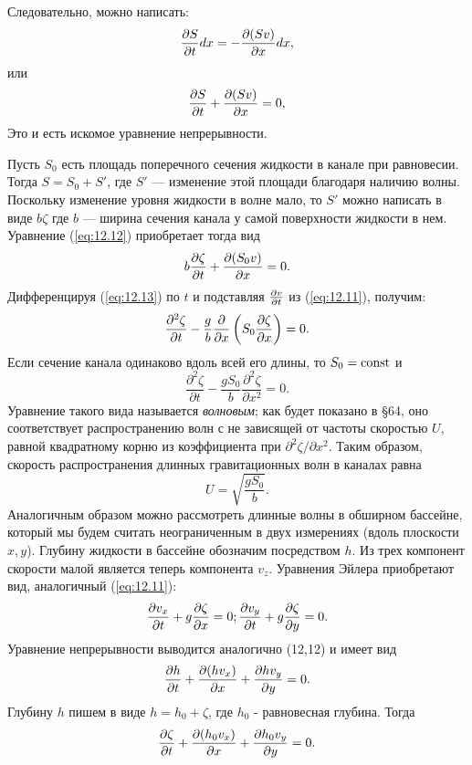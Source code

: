 Следовательно, можно написать:
\[
   \frac{\partial{S}}{\partial{t}}dx = - \frac{\partial{(Sv)}}{\partial{x}}dx,
\]
или
\begin{equation}
\label{eq:12.12}
       \frac{\partial{S}}{\partial{t}}+ \frac{\partial{(Sv)}}{\partial{x}} = 0,
\end{equation}
Это и есть искомое уравнение непрерывности.

Пусть $S_0$ есть площадь поперечного сечения жидкости в канале при равновесии.
Тогда $S = S_0 + S'$, где $S'$ — изменение этой площади благодаря наличию волны.
Поскольку изменение уровня жидкости в волне мало, то $S'$ можно написать в виде
$b\zeta$ где $b$ — ширина сечения канала у самой поверхности жидкости в нем.
Уравнение (\ref{eq:12.12}) приобретает тогда вид
\begin{equation}
    \label{eq:12.13}
    b \frac{\partial{\zeta}}{\partial{t}} + \frac{\partial{(S_0v)}}{\partial{x}} = 0.
\end{equation}
Дифференцируя (\ref{eq:12.13}) по $t$ и подставляя $\frac{\partial{v}}{\partial{t}}$ из (\ref{eq:12.11}), получим:
\begin{equation}
\label{eq:12.14}
   \frac{\partial^2\zeta}{\partial t} - \frac{g}{b} \frac{\partial}{\partial x}
   \left( S_0 \frac{\partial{\zeta}}{\partial{x}} \right) = 0.
\end{equation}
Если сечение канала одинаково вдоль всей его длины, то $S_0 = \mathop{\mathrm{const}}\nolimits$ и
\begin{equation}
\label{eq:12.15}
 \frac{\partial^2\zeta}{\partial t} - \frac{gS_0}{b} \frac{\partial^2\zeta}{\partial x^2} = 0.
\end{equation}
Уравнение такого вида называется \textit{волновым}; как будет показано в \S64,
оно соответствует распространению волн с не зависящей от частоты скоростью $U$,
равной квадратному корню из коэффициента при $\partial^2\zeta/\partial x^2$.
Таким образом, скорость распространения длинных гравитационных волн в каналах
равна
\begin{equation}
\label{eq:12.16}
   U=\sqrt{\frac{gS_0}{b}}.
\end{equation}
Аналогичным образом можно рассмотреть длинные волны в обширном бассейне, который
мы будем считать неограниченным в двух измерениях (вдоль плоскости $x,y$).
Глубину жидкости в бассейне обозначим посредством $h$. Из трех компонент
скорости малой является теперь компонента $v_z$. Уравнения Эйлера приобретают
вид, аналогичный (\ref{eq:12.11}):
\begin{equation}
\label{eq:12.17}
   \frac{\partial{v_x}}{\partial{t}}+g \frac{\partial{\zeta}}{\partial{x}} = 0; \\
   \frac{\partial{v_y}}{\partial{t}}+g \frac{\partial{\zeta}}{\partial{y}} = 0.
\end{equation}
Уравнение непрерывности выводится аналогично (12,12) и имеет вид
\[
   \frac{\partial{h}}{\partial{t}} + \frac{\partial{(hv_x)}}{\partial{x}} + \frac{\partial{hv_y}}{\partial{y}} = 0.
\]
Глубину $h$ пишем в виде $h = h_0 + \zeta$, где $h_0$ - равновесная глубина. Тогда
\begin{equation}
\label{eq:12.18}
      \frac{\partial{\zeta}}{\partial{t}} + \frac{\partial{(h_0v_x)}}{\partial{x}} + \frac{\partial{h_0v_y}}{\partial{y}} = 0.
\end{equation}

